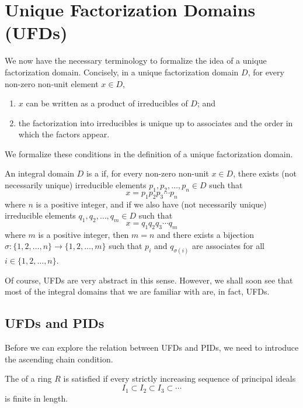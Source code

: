 \section{Unique Factorization Domains (UFDs)}
We now have the necessary terminology to formalize the idea of a unique factorization domain. Concisely, in a unique factorization domain $D$, for every non-zero non-unit element $x \in D$,
\begin{enumerate}
    \item $x$ can be written as a product of irreducibles of $D$; and
    \item the factorization into irreducibles is unique up to associates and the order in which the factors appear.
\end{enumerate}

We formalize these conditions in the definition of a unique factorization domain.

\begin{definition}
    An integral domain $D$ is a  if, for every non-zero non-unit $x \in D$, there exists (not necessarily unique) irreducible elements $p_1, p_2, \dots, p_n \in D$ such that
    \[
        x = p_1p_2p_3\cdots p_n
    \]
    where $n$ is a positive integer, and if we also have (not necessarily unique) irreducible elements $q_1, q_2, \dots, q_m \in D$ such that
    \[
        x = q_1q_2q_3\cdots q_m
    \]
    where $m$ is a positive integer, then $m = n$ and there exists a bijection $\sigma: \{1,2,\dots,n\} \to \{1,2,\dots,m\}$ such that $p_i$ and $q_{\sigma(i)}$ are associates for all $i \in \{1,2,\dots,n\}$.
\end{definition}

Of course, UFDs are very abstract in this sense. However, we shall soon see that most of the integral domains that we are familiar with are, in fact, UFDs.

\subsection{UFDs and PIDs}
Before we can explore the relation between UFDs and PIDs, we need to introduce the ascending chain condition.

\begin{definition}
    The  of a ring $R$ is satisfied if every strictly increasing sequence of principal ideals
    \[
        I_1 \subset I_2 \subset I_3 \subset \cdots
    \]
    is finite in length.
\end{definition}

